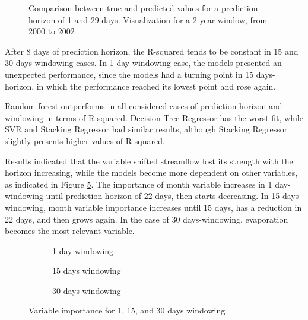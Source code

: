 \documentclass[12pt]{article}
\begin{document}
\begin{figure}[htb]
    \centering
    
    \caption{Comparison between true and predicted values for a prediction     horizon of 1 and 29 days. Visualization for a 2 year window, from 2000 to 2002}
    \label{fig:StackedComparisson}
\end{figure}

After 8 days of prediction horizon, the R-squared tends to be constant in 15 and 30 days-windowing cases. In 1 day-windowing case, the models presented an unexpected performance, since the models had a turning point in 15 days-horizon, in which the performance reached its lowest point and rose again.

Random forest outperforms in all considered cases of prediction horizon and windowing in terms of R-squared. Decision Tree Regressor has the worst fit, while SVR and Stacking Regressor had similar results, although Stacking Regressor slightly presents higher values of R-squared.

Results indicated that the variable shifted streamflow lost its strength with the horizon increasing, while the models become more dependent on other variables, as indicated in Figure \ref{fig:CategorizedImportance}. The importance of month variable increases in 1 day-windowing until prediction horizon of 22 days, then starts decreasing. In 15 days-windowing, month variable importance increases until 15 days, has a reduction in 22 days, and then grows again. In the case of 30 days-windowing, evaporation becomes the most relevant variable.

\begin{figure}[htb]
    \centering
    \begin{subfigure}[b]{.49\textwidth}
        \centering
        
        \caption{1 day windowing}
        \label{fig:CategorizedImportance01}
    \end{subfigure}
    \begin{subfigure}[b]{.49\textwidth}
        \centering
        
        \caption{15 days windowing}
        \label{fig:CategorizedImportance02}
    \end{subfigure}
    \begin{subfigure}[b]{\textwidth}
        \centering
        
        \captionsetup{justification=justified,singlelinecheck=false}
        \caption{30 days windowing}
        \label{fig:CategorizedImportance03}
    \end{subfigure}
    \caption{Variable importance for  1,  15, and  30 days windowing}
    \label{fig:CategorizedImportance}
\end{figure}
\end{document}
